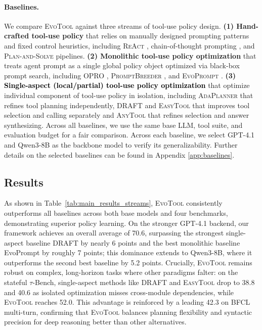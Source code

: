 \documentclass[11pt]{article}
\begin{document}
\paragraph{Baselines.}
We compare \textsc{EvoTool} against three streams of tool-use policy design.
\textbf{(1) Hand-crafted tool-use policy} that relies on manually designed prompting patterns and fixed control heuristics, including \textsc{ReAct} \cite{yao2022react}, chain-of-thought prompting \cite[CoT,][]{wei2022chain}, and \textsc{Plan-and-Solve} \cite{wang-etal-2023-plan} pipelines.
\textbf{(2) Monolithic tool-use policy optimization} that treats agent prompt as a single global policy object optimized via black-box prompt search, including \textsc{OPRO} \cite{yang2023large}, \textsc{PromptBreeder} \cite{fernando2023promptbreeder}, and \textsc{EvoPrompt} \cite{guo2023connecting}.
\textbf{(3) \textcolor{black}{Single-aspect (local/partial) tool-use policy optimization}} that optimize individual component of tool-use policy in isolation, including \textsc{AdaPlanner} \cite{sun2023adaplanner} that refines tool planning independently, \textsc{DRAFT} \cite{qu2024exploration} and \textsc{EasyTool} \cite{yuan2025easytool} that improves tool selection and calling separately and \textsc{AnyTool} \cite{du2024anytool} that refines selection and answer synthesizing.
Across all baselines, we use the same base LLM, tool suite, and evaluation budget for a fair comparison. Across each baseline, we select GPT-4.1 \cite{openai2025gpt41} and Qwen3-8B \cite{yang2025qwen3} as the backbone model to verify its generalizability.
Further details on the selected baselines can be found in Appendix \ref{app:baselines}.








\subsection{Results}




As shown in Table~\ref{tab:main_results_streams}, \textsc{EvoTool} consistently outperforms all baselines across both base models and four benchmarks, demonstrating superior policy learning. On the stronger GPT-4.1 backend, our framework achieves an overall average of 70.6, surpassing the strongest single-aspect baseline DRAFT by nearly 6 points and the best monolithic baseline EvoPrompt by roughly 7 points; this dominance extends to Qwen3-8B, where it outperforms the second best baseline by 5.2 points. Crucially, \textsc{EvoTool} remains robust on complex, long-horizon tasks where other paradigms falter: on the stateful $\tau$-Bench, single-aspect methods like DRAFT and \textsc{EasyTool} drop to 38.8 and 40.6 as isolated optimization misses cross-module dependencies, while \textsc{EvoTool} reaches 52.0. This advantage is reinforced by a leading 42.3 on BFCL multi-turn, confirming that \textsc{EvoTool} balances planning flexibility and syntactic precision for deep reasoning better than other alternatives.
\end{document}
